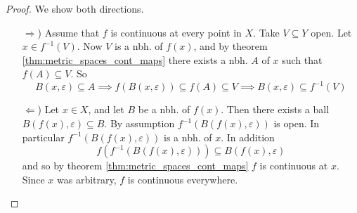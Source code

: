 \begin{proof}
   We show both directions.
   \begin{enumerate}
     \item[\( \Rightarrow \))] 
      Assume that \( f \) is continuous at every point in \( X \).
      Take \( V \subseteq Y \) open. Let \( x \in {f}^{-1} (V) \).
      Now \( V \) is a nbh. of \( f(x) \), and by theorem \ref{thm:metric_spaces_cont_maps}
      there exists a nbh. \( A \) of \( x \) such that \( f(A) \subseteq V \).
      So 
      \[
        B(x, \varepsilon) \subseteq A
        \implies f(B(x, \varepsilon)) \subseteq f(A) \subseteq V
        \implies B(x, \varepsilon) \subseteq {f}^{-1} (V)
      \]

     \item[\( \Leftarrow \))]
       Let \( x \in X \), and let \( B \) be a nbh. of \( f(x) \).
       Then there exists a ball \( B(f(x), \varepsilon) \subseteq B \).
       By assumption \( {f}^{-1} (B(f(x), \varepsilon)) \) is open.
       In particular \( {f}^{-1} (B(f(x), \varepsilon)) \) is a nbh. of \( x \).
       In addition
       \[
        f({f}^{-1} (B(f(x), \varepsilon))) \subseteq B(f(x), \varepsilon)
       \]
        and so by theorem \ref{thm:metric_spaces_cont_maps} \( f \) is continuous
        at \( x \). Since \( x \) was arbitrary, \( f \) is continuous everywhere.
   \end{enumerate}
\end{proof}
